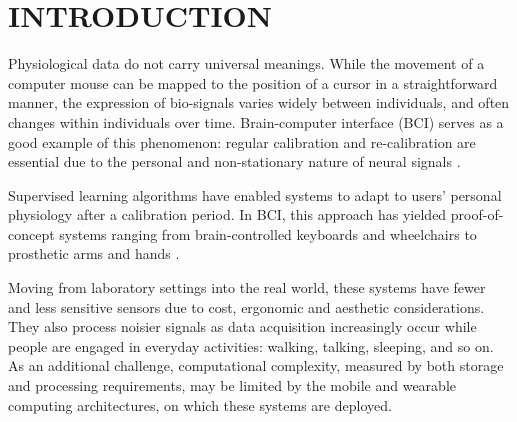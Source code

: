 \section{\uppercase{Introduction}}
\label{sec:introduction}

\noindent Physiological data do not carry universal meanings. While the movement of a computer mouse can be mapped to the position of a cursor in a straightforward manner, the expression of bio-signals varies widely between individuals, and often changes within individuals over time. Brain-computer interface (BCI) serves as a good example of this phenomenon: regular calibration and re-calibration are essential due to the personal and non-stationary nature of neural signals \cite{dornhege_toward_2007,mcfarland_brain-computer_2011}.

Supervised learning algorithms have enabled systems to adapt to users' personal physiology after a calibration period. In BCI, this approach has yielded proof-of-concept systems ranging from brain-controlled keyboards and wheelchairs to prosthetic arms and hands \cite{blankertz_note_2007,millan_combining_2010,d._mattia_brain_2011,hill_practical_2014,campbell_neurophone:_2010}. 



Moving from laboratory settings into the real world, these systems have fewer and less sensitive sensors due to cost, ergonomic and aesthetic considerations. They also process noisier signals as data acquisition increasingly occur while people are engaged in everyday activities: walking, talking, sleeping, and so on. As an additional challenge, computational complexity, measured by both storage and processing requirements, may be limited by the mobile and wearable computing architectures, on which these systems are deployed. 

